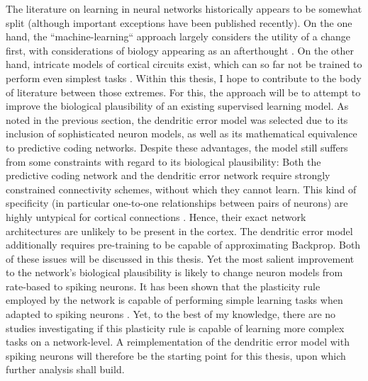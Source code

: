 The literature on learning in neural networks historically appears to be somewhat split (although important exceptions
have been published recently). On the one hand, the ``machine-learning`` approach largely considers the utility of a
change first, with considerations of biology appearing as an afterthought \citep{LeCun2015}. On the other hand,
intricate models of cortical circuits exist, which can so far not be trained to perform even simplest tasks
\citep{potjans2014cell,schmidt2018multi,van2022bringing}. Within this thesis, I hope to contribute to the body of
literature between those extremes. For this, the approach will be to attempt to improve the biological plausibility of
an existing supervised learning model. As noted in the previous section, the dendritic error model
\citep{sacramento2018dendritic} was selected due to its inclusion of sophisticated neuron models, as well as its
mathematical equivalence to predictive coding networks. Despite these advantages, the model still suffers from some
constraints with regard to its biological plausibility: Both the predictive coding network and the dendritic error
network require strongly constrained connectivity schemes, without which they cannot learn. This kind of specificity (in
particular one-to-one relationships between pairs of neurons) are highly untypical for cortical connections
\citep{Thomson2003}. Hence, their exact network architectures are unlikely to be present in the cortex. The dendritic
error model additionally requires pre-training to be capable of approximating Backprop. Both of these issues will be
discussed in this thesis. Yet the most salient improvement to the network's biological plausibility is likely to change
neuron models from rate-based to spiking neurons. It has been shown that the plasticity rule employed by the network is
capable of performing simple learning tasks when adapted to spiking neurons \citep{Stapmanns2021}. Yet, to the best of
my knowledge, there are no studies investigating if this plasticity rule is capable of learning more complex tasks on a
network-level. A reimplementation of the dendritic error model with spiking neurons will therefore be the starting point
for this thesis, upon which further analysis shall build.